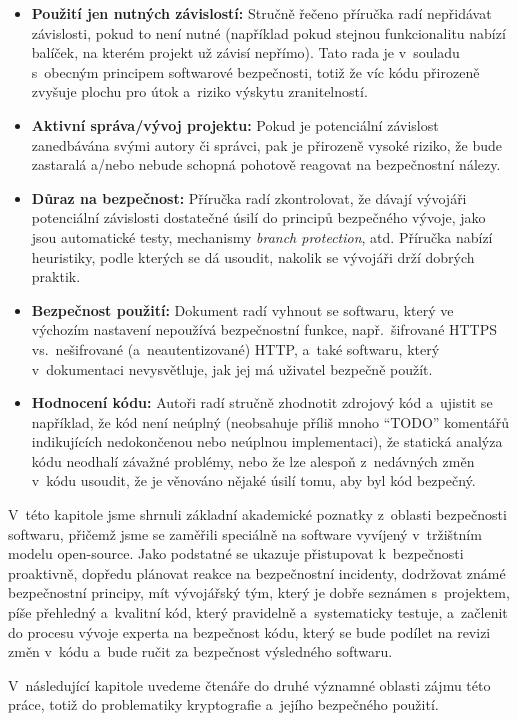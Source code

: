 \begin{itemize}
    \item \textbf{Použití jen nutných závislostí:} \enskip
        Stručně řečeno příručka radí nepřidávat závislosti, pokud to není nutné (například pokud stejnou funkcionalitu nabízí balíček, na kterém projekt už závisí nepřímo). Tato rada je v~souladu s~obecným principem softwarové bezpečnosti, totiž že víc kódu přirozeně zvyšuje plochu pro útok a~riziko výskytu zranitelností.

    \item \textbf{Aktivní správa/vývoj projektu:} \enskip
        Pokud je potenciální závislost zanedbávána svými autory či správci, pak je přirozeně vysoké riziko, že bude zastaralá a/nebo nebude schopná pohotově reagovat na bezpečnostní nálezy.

    \item \textbf{Důraz na bezpečnost:} \enskip
        Příručka radí zkontrolovat, že dávají vývojáři potenciální závislosti dostatečné úsilí do principů bezpečného vývoje, jako jsou automatické testy, mechanismy \emph{branch protection}, atd. Příručka nabízí heuristiky, podle kterých se dá usoudit, nakolik se vývojáři drží dobrých praktik.

    \item \textbf{Bezpečnost použití:} \enskip
        Dokument radí vyhnout se softwaru, který ve výchozím nastavení nepoužívá bezpečnostní funkce, např.\ šifrované HTTPS vs.\ nešifrované (a~neautentizované) HTTP, a~také softwaru, který v~dokumentaci nevysvětluje, jak jej má uživatel bezpečně použít.

    \item \textbf{Hodnocení kódu:} \enskip
        Autoři radí stručně zhodnotit zdrojový kód a~ujistit se například, že kód není neúplný (neobsahuje příliš mnoho ``TODO'' komentářů indikujících nedokončenou nebo neúplnou implementaci), že statická analýza kódu neodhalí závažné problémy, nebo že lze alespoň z~nedávných změn v~kódu usoudit, že je věnováno nějaké úsilí tomu, aby byl kód bezpečný.
\end{itemize}

V~této kapitole jsme shrnuli základní akademické poznatky z~oblasti bezpečnosti softwaru, přičemž jsme se zaměřili speciálně na software vyvíjený v~tržištním modelu open-source. Jako podstatné se ukazuje přistupovat k~bez\-peč\-nos\-ti proaktivně, dopředu plánovat reakce na bez\-peč\-nost\-ní incidenty, dodržovat známé bez\-peč\-nost\-ní principy, mít vývojářský tým, který je dobře seznámen s~projektem, píše přehledný a~kvalitní kód, který pravidelně a~systematicky testuje, a~začlenit do procesu vývoje experta na bezpečnost kódu, který se bude podílet na revizi změn v~kódu a~bude ručit za bez\-peč\-nost výsledného softwaru.

V~následující kapitole uvedeme čtenáře do druhé významné oblasti zájmu této práce, totiž do problematiky kryptografie a~jejího bezpečného použití.
